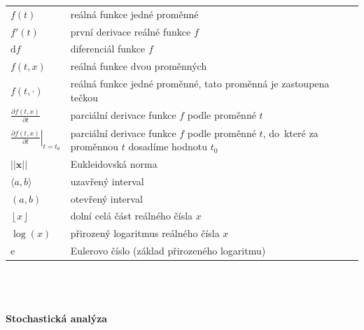 \documentclass[a4paper,12pt]{report}
\theoremstyle{definition} \newtheorem{definice}[veta]{Definice}
\theoremstyle{remark}
\begin{document}
   \begin{tabular}{p{4cm} p{9.3cm}}
   $f(t)$				& reálná funkce jedné proměnné\\
   $f'(t)$				& první derivace reálné funkce $f$\\
   $\mathrm{d}f$				& diferenciál funkce $f$\\
   $f(t,x)$					&reálná funkce dvou proměnných\\ 
   $f(t,\cdot)$				& reálná funkce jedné proměnné, tato proměnná je zastoupena tečkou\\
   $\frac{\partial f(t,x)}{\partial t}$				& parciální derivace funkce $f$ podle proměnné $t$\\
   $\left.\frac{\partial f(t,x)}{\partial t}\right|_{t=t_0}$				& parciální derivace funkce $f$ podle proměnné $t$, do~které za proměnnou $t$ dosadíme hodnotu $t_0$\\
   $||\boldsymbol x||$				& Eukleidovská norma\\
   $\langle a,b\rangle$				& uzavřený interval\\
   $\left(a,b\right)$				          & otevřený interval\\
   $\left\lfloor x\right\rfloor$			& dolní celá část reálného čísla $x$\\
   $\log(x)$		  		& přirozený logaritmus reálného čísla $x$\\
   $\mathrm{e}$			& Eulerovo číslo (základ přirozeného logaritmu)
   \end{tabular}\\\\\\
%
%
\textbf{Stochastická analýza}\\\\
\end{document}
